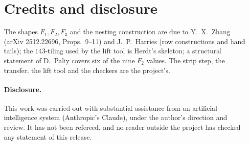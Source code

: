 \documentclass[11pt,reqno]{amsart}
\theoremstyle{plain}
\theoremstyle{definition}
\begin{document}
\section*{Credits and disclosure}
The shapes $F_1,F_2,F_3$ and the nesting construction are due to Y.~X.~Zhang (arXiv 2512.22696, Props.~9--11) and J.~P.~Harries
(row constructions and hand tails); the $143$-tiling used by the lift tool is Herdt's skeleton; a structural statement of
D.~Paliy covers six of the nine $F_2$ values. The strip step, the transfer, the lift tool and the checkers are the project's.
\paragraph{Disclosure.} This work was carried out with substantial assistance from an artificial-intelligence system
(Anthropic's Claude), under the author's direction and review. It has not been refereed, and no reader outside the
project has checked any statement of this release.
\end{document}
